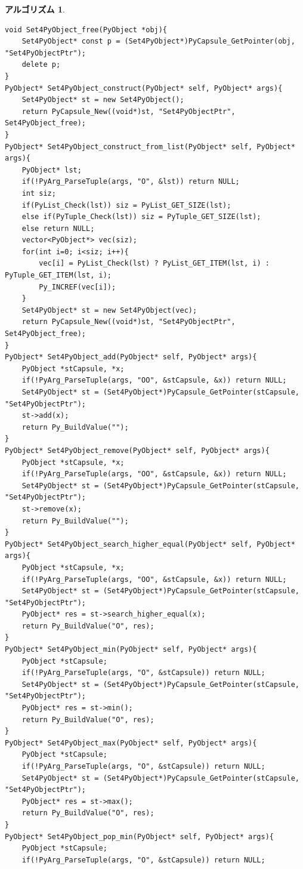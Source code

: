 \documentclass[12pt, a4j]{ltjsarticle}
\newtheorem{alg}[thm]{アルゴリズム}
\begin{document}
\begin{alg}
\begin{lstlisting}
void Set4PyObject_free(PyObject *obj){
    Set4PyObject* const p = (Set4PyObject*)PyCapsule_GetPointer(obj, "Set4PyObjectPtr");
    delete p;
}
PyObject* Set4PyObject_construct(PyObject* self, PyObject* args){
    Set4PyObject* st = new Set4PyObject();
    return PyCapsule_New((void*)st, "Set4PyObjectPtr", Set4PyObject_free);
}
PyObject* Set4PyObject_construct_from_list(PyObject* self, PyObject* args){
    PyObject* lst;
    if(!PyArg_ParseTuple(args, "O", &lst)) return NULL;
    int siz;
    if(PyList_Check(lst)) siz = PyList_GET_SIZE(lst);
    else if(PyTuple_Check(lst)) siz = PyTuple_GET_SIZE(lst);
    else return NULL;
    vector<PyObject*> vec(siz);
    for(int i=0; i<siz; i++){
        vec[i] = PyList_Check(lst) ? PyList_GET_ITEM(lst, i) : PyTuple_GET_ITEM(lst, i);
        Py_INCREF(vec[i]);
    }
    Set4PyObject* st = new Set4PyObject(vec);
    return PyCapsule_New((void*)st, "Set4PyObjectPtr", Set4PyObject_free);
}
PyObject* Set4PyObject_add(PyObject* self, PyObject* args){
    PyObject *stCapsule, *x;
    if(!PyArg_ParseTuple(args, "OO", &stCapsule, &x)) return NULL;
    Set4PyObject* st = (Set4PyObject*)PyCapsule_GetPointer(stCapsule, "Set4PyObjectPtr");
    st->add(x);
    return Py_BuildValue("");
}
PyObject* Set4PyObject_remove(PyObject* self, PyObject* args){
    PyObject *stCapsule, *x;
    if(!PyArg_ParseTuple(args, "OO", &stCapsule, &x)) return NULL;
    Set4PyObject* st = (Set4PyObject*)PyCapsule_GetPointer(stCapsule, "Set4PyObjectPtr");
    st->remove(x);
    return Py_BuildValue("");
}
PyObject* Set4PyObject_search_higher_equal(PyObject* self, PyObject* args){
    PyObject *stCapsule, *x;
    if(!PyArg_ParseTuple(args, "OO", &stCapsule, &x)) return NULL;
    Set4PyObject* st = (Set4PyObject*)PyCapsule_GetPointer(stCapsule, "Set4PyObjectPtr");
    PyObject* res = st->search_higher_equal(x);
    return Py_BuildValue("O", res);
}
PyObject* Set4PyObject_min(PyObject* self, PyObject* args){
    PyObject *stCapsule;
    if(!PyArg_ParseTuple(args, "O", &stCapsule)) return NULL;
    Set4PyObject* st = (Set4PyObject*)PyCapsule_GetPointer(stCapsule, "Set4PyObjectPtr");
    PyObject* res = st->min();
    return Py_BuildValue("O", res);
}
PyObject* Set4PyObject_max(PyObject* self, PyObject* args){
    PyObject *stCapsule;
    if(!PyArg_ParseTuple(args, "O", &stCapsule)) return NULL;
    Set4PyObject* st = (Set4PyObject*)PyCapsule_GetPointer(stCapsule, "Set4PyObjectPtr");
    PyObject* res = st->max();
    return Py_BuildValue("O", res);
}
PyObject* Set4PyObject_pop_min(PyObject* self, PyObject* args){
    PyObject *stCapsule;
    if(!PyArg_ParseTuple(args, "O", &stCapsule)) return NULL;

\end{lstlisting}
\end{alg}
\end{document}
